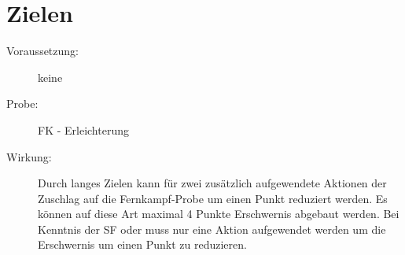 \section{Zielen}
\label{fkM.zielen}
\begin{description}
    \item[Voraussetzung:]
        keine
    \item[Probe:]
        FK - Erleichterung
    \item[Wirkung:]
        Durch langes Zielen kann für zwei zusätzlich aufgewendete Aktionen der Zuschlag auf die Fernkampf-Probe um einen Punkt reduziert werden.
        Es können auf diese Art maximal 4 Punkte Erschwernis abgebaut werden.
        Bei Kenntnis der SF  oder  muss nur eine Aktion aufgewendet werden um die Erschwernis um einen Punkt zu reduzieren.
\end{description}
